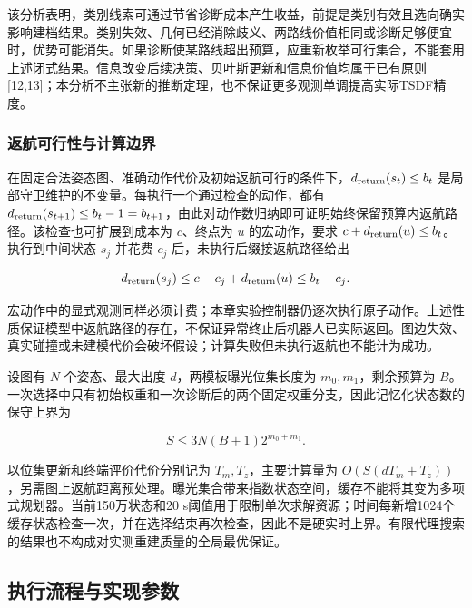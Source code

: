 \documentclass[11pt,a4paper]{article}
\numberwithin{equation}{section}
\begin{document}
该分析表明，类别线索可通过节省诊断成本产生收益，前提是类别有效且选向确实影响建档结果。类别失效、几何已经消除歧义、两路线价值相同或诊断足够便宜时，优势可能消失。如果诊断使某路线超出预算，应重新枚举可行集合，不能套用上述闭式结果。信息改变后续决策、贝叶斯更新和信息价值均属于已有原则{[}12,13{]}；本分析不主张新的推断定理，也不保证更多观测单调提高实际TSDF精度。

\hypertarget{ux8fd4ux822aux53efux884cux6027ux4e0eux8ba1ux7b97ux8fb9ux754c}{%
\subsubsection{返航可行性与计算边界}\label{ux8fd4ux822aux53efux884cux6027ux4e0eux8ba1ux7b97ux8fb9ux754c}}

在固定合法姿态图、准确动作代价及初始返航可行的条件下，\(d_{\rm return}(s_t)\le b_t\) 是局部守卫维护的不变量。每执行一个通过检查的动作，都有 \(d_{\rm return}(s_{t+1})\le b_t-1=b_{t+1}\)，由此对动作数归纳即可证明始终保留预算内返航路径。该检查也可扩展到成本为 \(c\)、终点为 \(u\) 的宏动作，要求 \(c+d_{\rm return}(u)\le b_t\)。执行到中间状态 \(s_j\) 并花费 \(c_j\) 后，未执行后缀接返航路径给出

\begin{equation}
d_{\rm return}(s_j)
\le c-c_j+d_{\rm return}(u)
\le b_t-c_j.
\end{equation}

宏动作中的显式观测同样必须计费；本章实验控制器仍逐次执行原子动作。上述性质保证模型中返航路径的存在，不保证异常终止后机器人已实际返回。图边失效、真实碰撞或未建模代价会破坏假设；计算失败但未执行返航也不能计为成功。

设图有 \(N\) 个姿态、最大出度 \(d\)，两模板曝光位集长度为 \(m_0,m_1\)，剩余预算为 \(B\)。一次选择中只有初始权重和一次诊断后的两个固定权重分支，因此记忆化状态数的保守上界为

\begin{equation}
S\le3N(B+1)2^{m_0+m_1}.
\end{equation}

以位集更新和终端评价代价分别记为 \(T_m,T_z\)，主要计算量为 \(O(S(dT_m+T_z))\)，另需图上返航距离预处理。曝光集合带来指数状态空间，缓存不能将其变为多项式规划器。当前150万状态和20 s阈值用于限制单次求解资源；时间每新增1024个缓存状态检查一次，并在选择结束再次检查，因此不是硬实时上界。有限代理搜索的结果也不构成对实测重建质量的全局最优保证。

\hypertarget{ux6267ux884cux6d41ux7a0bux4e0eux5b9eux73b0ux53c2ux6570}{%
\subsection{执行流程与实现参数}\label{ux6267ux884cux6d41ux7a0bux4e0eux5b9eux73b0ux53c2ux6570}}
\end{document}
